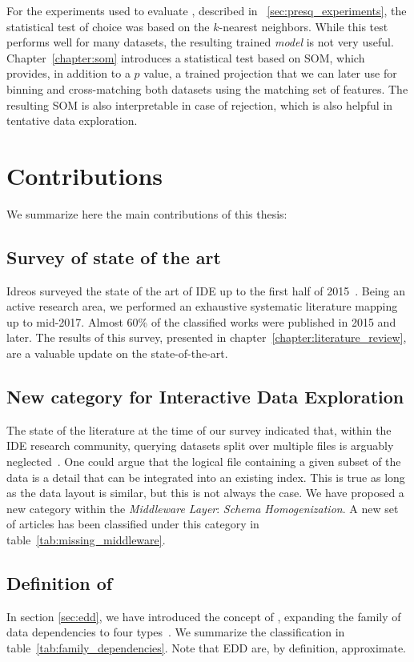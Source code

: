 For the experiments used to evaluate \PresQ, described in ~\ref{sec:presq_experiments},
the statistical test of choice was based on the $k$-nearest neighbors. While this test
performs well for many datasets, the resulting trained \emph{model} is not
very useful.
Chapter~\ref{chapter:som} introduces a statistical test based on \gls{SOM}, which provides,
in addition to a $p$ value, a trained projection that we can later use for binning and
cross-matching both datasets using the matching set of features. The resulting \gls{SOM}
is also interpretable in case of rejection, which is also helpful in tentative data exploration.

\section{Contributions}

We summarize here the main contributions of this thesis:

\subsection{Survey of state of the art}
Idreos \etal surveyed the state of the art of \gls{IDE} up to the first half of 2015~\cite{Idreos2015}.
Being an active research area, we performed an exhaustive systematic literature mapping up to mid-2017.
Almost 60\% of the classified works were published in 2015 and later. The results
of this survey, presented in chapter~\ref{chapter:literature_review}, are a valuable update on
the state-of-the-art.

\subsection{New category for Interactive Data Exploration}

The state of the literature at the time of our survey indicated that, within the
\gls{IDE} research community, querying datasets split over multiple files is arguably
neglected~\cite{Silva2016}. One could argue that the logical file containing a given
subset of the data is a detail that can be integrated into an existing index. This is
true as long as the data layout is similar, but this is not always the case.
We have proposed a new category within the \emph{Middleware Layer}: \emph{Schema Homogenization}.
A new set of articles has been classified under this category in table~\ref{tab:missing_middleware}.

\subsection{Definition of \texorpdfstring{}{Equally-Distributed Dependencies}}
In section \ref{sec:edd}, we have introduced the concept of , expanding
the family of data dependencies to four types~\cite{abedjan2015}. We
summarize the classification in table~\ref{tab:family_dependencies}.
Note that \gls{EDD} are, by definition, approximate.

